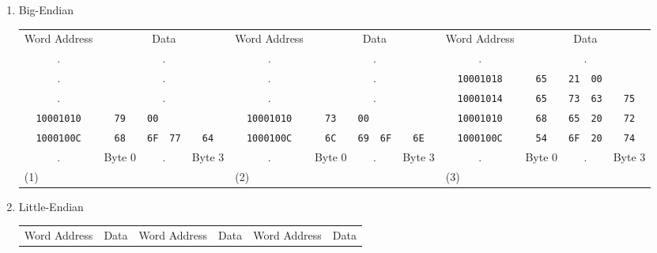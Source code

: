 \documentclass[12pt]{article}
\begin{document}
    \begin{enumerate}
        \item Big-Endian
        \begin{table}[h!]
            \small
            \setlength\tabcolsep{2pt}
            \centering
            \begin{tabular}{ccccccccccccccc}
                Word Address & \multicolumn{4}{c}{Data} & Word Address & \multicolumn{4}{c}{Data} & Word Address & \multicolumn{4}{c}{Data} \\
                . & \multicolumn{4}{c}{.} & . & \multicolumn{4}{c}{.} & . & \multicolumn{4}{c}{.} \\
                . & \multicolumn{4}{c}{.} & . & \multicolumn{4}{c}{.} & \texttt{10001018} & \texttt{65} & \texttt{21} & \texttt{00} & \\
                . & \multicolumn{4}{c}{.} & . & \multicolumn{4}{c}{.} & \texttt{10001014} & \texttt{65} & \texttt{73} & \texttt{63} & \texttt{75} \\
                \texttt{10001010} & \texttt{79} & \texttt{00} & & & \texttt{10001010} & \texttt{73} & \texttt{00} & & & \texttt{10001010} &\texttt{68} & \texttt{65} & \texttt{20} & \texttt{72} \\
                \texttt{1000100C} & \texttt{68} & \texttt{6F} & \texttt{77} & \texttt{64} & \texttt{1000100C} & \texttt{6C} & \texttt{69} & \texttt{6F} & \texttt{6E} & \texttt{1000100C} & \texttt{54} & \texttt{6F} & \texttt{20} & \texttt{74} \\
                . & \multicolumn{1}{l}{ {\scriptsize Byte 0}} & \multicolumn{2}{c}{.} & \multicolumn{1}{r}{ {\scriptsize Byte 3}} & . & \multicolumn{1}{l}{ {\scriptsize Byte 0}} & \multicolumn{2}{c}{.} & \multicolumn{1}{r}{ {\scriptsize Byte 3}} & . & \multicolumn{1}{l}{ {\scriptsize Byte 0}} & \multicolumn{2}{c}{.} & \multicolumn{1}{r}{ {\scriptsize Byte 3}} \\
                \multicolumn{5}{l}{(1)} & \multicolumn{5}{l}{(2)} & \multicolumn{5}{l}{(3)} \\
            \end{tabular}
        \end{table}
        \item Little-Endian
        \begin{table}[h!]
            \small
            \setlength\tabcolsep{2pt}
            \centering
            \begin{tabular}{ccccccccccccccc}
                Word Address & \multicolumn{4}{c}{Data} & Word Address & \multicolumn{4}{c}{Data} & Word Address & \multicolumn{4}{c}{Data} \\

\end{tabular}
\end{table}
\end{enumerate}
\end{document}
